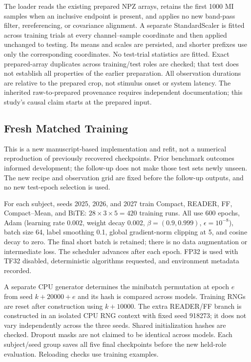 \documentclass[conference]{IEEEtran}
\begin{document}
The loader reads the existing prepared NPZ arrays, retains the first 1000 MI
samples when an inclusive endpoint is present, and applies no new band-pass
filter, rereferencing, or covariance alignment. A separate StandardScaler is
fitted across training trials at every channel--sample coordinate and then
applied unchanged to testing. Its means and scales are persisted, and shorter
prefixes use only the corresponding coordinates. No test-trial statistics
are fitted. Exact prepared-array duplicates across training/test roles are
checked; that test does not establish all properties of the earlier preparation.
All observation durations are relative to the prepared crop, not stimulus
onset or system latency. The inherited raw-to-prepared provenance requires
independent documentation; this study's causal claim starts at the prepared
input.

\subsection{Fresh Matched Training}
This is a new manuscript-based implementation and refit, not a numerical
reproduction of previously recovered checkpoints. Prior benchmark outcomes
informed development; the follow-up does not make those test sets newly
unseen. The new recipe and observation grid are fixed before the follow-up
outputs, and no new test-epoch selection is used.

For each subject, seeds 2025, 2026, and 2027 train Compact, READER, FF,
Compact--Mean, and BiTE: $28\times3\times5=420$ training runs.
All use 600 epochs, Adam (learning rate 0.002, weight decay 0.002,
$\beta=(0.9,0.999)$, $\epsilon=10^{-8}$), batch size 64, label smoothing 0.1,
global gradient-norm clipping at 5, and cosine decay to zero. The final short
batch is retained; there is no data augmentation or intermediate loss.
The scheduler advances after each epoch. FP32 is used with TF32 disabled,
deterministic algorithms requested, and environment metadata recorded.

A separate CPU generator determines the minibatch permutation at epoch $e$
from seed $k+20000+e$ and its hash is compared across models. Training RNGs
are reset after construction using $k+10000$. The extra READER/FF branch is
constructed in an isolated CPU RNG context with fixed seed 918273; it does
not vary independently across the three seeds. Shared initialization hashes
are checked. Dropout masks are not claimed to be identical across models.
Each subject/seed group saves all five final checkpoints before the new
held-role evaluation. Reloading checks use training examples.
\end{document}
